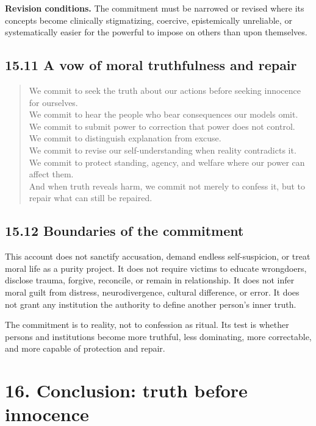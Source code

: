 \documentclass[
  11pt,
]{article}
\begin{document}
\textbf{Revision conditions.} The commitment must be narrowed or revised
where its concepts become clinically stigmatizing, coercive,
epistemically unreliable, or systematically easier for the powerful to
impose on others than upon themselves.

\subsection{15.11 A vow of moral truthfulness and
repair}\label{a-vow-of-moral-truthfulness-and-repair}

\begin{quote}
We commit to seek the truth about our actions before seeking innocence
for ourselves.\\
We commit to hear the people who bear consequences our models omit.\\
We commit to submit power to correction that power does not control.\\
We commit to distinguish explanation from excuse.\\
We commit to revise our self-understanding when reality contradicts
it.\\
We commit to protect standing, agency, and welfare where our power can
affect them.\\
And when truth reveals harm, we commit not merely to confess it, but to
repair what can still be repaired.
\end{quote}

\subsection{15.12 Boundaries of the
commitment}\label{boundaries-of-the-commitment}

This account does not sanctify accusation, demand endless
self-suspicion, or treat moral life as a purity project. It does not
require victims to educate wrongdoers, disclose trauma, forgive,
reconcile, or remain in relationship. It does not infer moral guilt from
distress, neurodivergence, cultural difference, or error. It does not
grant any institution the authority to define another person's inner
truth.

The commitment is to reality, not to confession as ritual. Its test is
whether persons and institutions become more truthful, less dominating,
more correctable, and more capable of protection and repair.

\section{16. Conclusion: truth before
innocence}\label{conclusion-truth-before-innocence}
\end{document}
